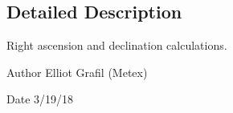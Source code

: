 \subsection{Detailed Description}
Right ascension and declination calculations. 

\begin{DoxyAuthor}{Author}
Elliot Grafil (Metex) 
\end{DoxyAuthor}
\begin{DoxyDate}{Date}
3/19/18 
\end{DoxyDate}
